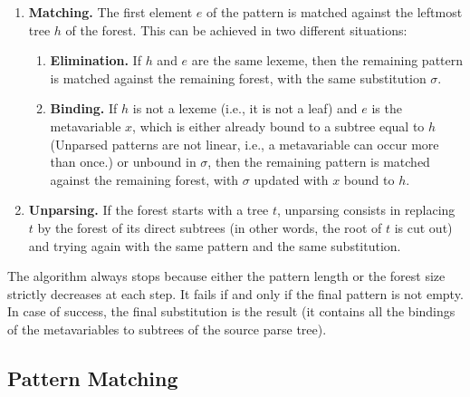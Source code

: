 \begin{enumerate}

  \item \textbf{Matching.} The first element \(e\) of the pattern is
    matched against the leftmost tree \(h\) of the forest. This can be
    achieved in two different situations:
    \begin{enumerate}
    
      \item \textbf{Elimination.} If \(h\) and \(e\) are the same
        lexeme, then the remaining pattern is matched against the
        remaining forest, with the same substitution \(\sigma\).

      \item \textbf{Binding.} If \(h\) is not a lexeme (i.e., it is
        not a leaf) and \(e\) is the meta\-variable \(x\), which is
        either already bound to a subtree equal to \(h\) (Unparsed
        patterns are not linear, i.e., a meta\-variable can occur more
        than once.) or unbound in \(\sigma\), then the remaining
        pattern is matched against the remaining forest, with
        \(\sigma\) updated with \(x\) bound to \(h\).

  \end{enumerate}

  \item \textbf{Unparsing.} If the forest starts with a tree \(t\),
    unparsing consists in replacing \(t\) by the forest of its direct
    subtrees (in other words, the root of \(t\) is cut out) and trying
    again with the same pattern and the same substitution.

\end{enumerate}
The algorithm always stops because either the pattern length or the
forest size strictly decreases at each step. It fails if and only if
the final pattern is not empty. In case of success, the final
substitution is the result (it contains all the bindings of the
meta\-variables to subtrees of the source parse tree).


\subsection{Pattern Matching}

